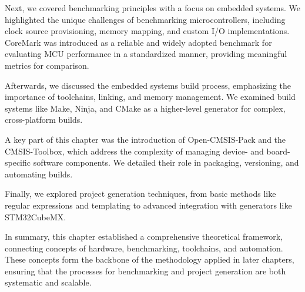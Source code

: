 Next, we covered benchmarking principles with a focus on embedded systems. We highlighted the unique challenges of benchmarking microcontrollers, including clock source provisioning, memory mapping, and custom I/O implementations. CoreMark was introduced as a reliable and widely adopted benchmark for evaluating MCU performance in a standardized manner, providing meaningful metrics for comparison.

Afterwards, we discussed the embedded systems build process, emphasizing the importance of toolchains, linking, and memory management. We examined build systems like Make, Ninja, and CMake as a higher-level generator for complex, cross-platform builds.

A key part of this chapter was the introduction of Open-CMSIS-Pack and the CMSIS-Toolbox, which address the complexity of managing device- and board-specific software components. We detailed their role in packaging, versioning, and automating builds.

Finally, we explored project generation techniques, from basic methods like regular expressions and templating to advanced integration with generators like STM32CubeMX.

In summary, this chapter established a comprehensive theoretical framework, connecting concepts of hardware, benchmarking, toolchains, and automation. These concepts form the backbone of the methodology applied in later chapters, ensuring that the processes for benchmarking and project generation are both systematic and scalable.
